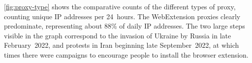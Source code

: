 \documentclass[letterpaper,twocolumn]{article}
\begin{document}
\autoref{fig:proxy-type} shows the
comparative counts of the different types of proxy,
counting unique IP addresses per 24~hours.
The WebExtension proxies clearly predominate,
representing about 88\% of daily IP addresses.
The two large steps visible in the graph correspond
to the invasion of Ukraine by Russia in late February~2022,
and protests in Iran beginning late September~2022,
at which times there were campaigns
to encourage people to install the browser extension.
\end{document}
